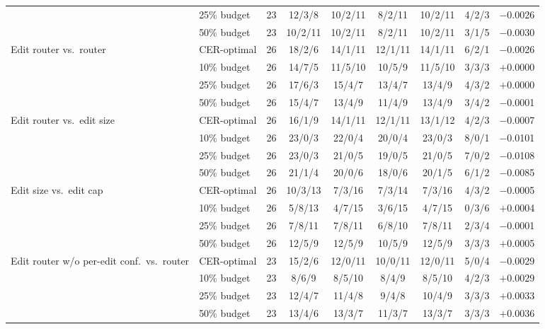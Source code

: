 \begin{tabular}{llrcccccr}
 & 25\% budget & 23 & 12/3/8 & 10/2/11 & 8/2/11 & 10/2/11 & 4/2/3 & $-$0.0026 \\
 & 50\% budget & 23 & 10/2/11 & 10/2/11 & 8/2/11 & 10/2/11 & 3/1/5 & $-$0.0030 \\
\addlinespace[2pt]
Edit router vs.\ router & CER-optimal & 26 & 18/2/6 & 14/1/11 & 12/1/11 & 14/1/11 & 6/2/1 & $-$0.0026 \\
 & 10\% budget & 26 & 14/7/5 & 11/5/10 & 10/5/9 & 11/5/10 & 3/3/3 & $+$0.0000 \\
 & 25\% budget & 26 & 17/6/3 & 15/4/7 & 13/4/7 & 13/4/9 & 4/3/2 & $+$0.0000 \\
 & 50\% budget & 26 & 15/4/7 & 13/4/9 & 11/4/9 & 13/4/9 & 3/4/2 & $-$0.0001 \\
\addlinespace[2pt]
Edit router vs.\ edit size & CER-optimal & 26 & 16/1/9 & 14/1/11 & 12/1/11 & 13/1/12 & 4/2/3 & $-$0.0007 \\
 & 10\% budget & 26 & 23/0/3 & 22/0/4 & 20/0/4 & 23/0/3 & 8/0/1 & $-$0.0101 \\
 & 25\% budget & 26 & 23/0/3 & 21/0/5 & 19/0/5 & 21/0/5 & 7/0/2 & $-$0.0108 \\
 & 50\% budget & 26 & 21/1/4 & 20/0/6 & 18/0/6 & 20/1/5 & 6/1/2 & $-$0.0085 \\
\addlinespace[2pt]
Edit size vs.\ edit cap & CER-optimal & 26 & 10/3/13 & 7/3/16 & 7/3/14 & 7/3/16 & 4/3/2 & $-$0.0005 \\
 & 10\% budget & 26 & 5/8/13 & 4/7/15 & 3/6/15 & 4/7/15 & 0/3/6 & $+$0.0004 \\
 & 25\% budget & 26 & 7/8/11 & 7/8/11 & 6/8/10 & 7/8/11 & 2/3/4 & $-$0.0001 \\
 & 50\% budget & 26 & 12/5/9 & 12/5/9 & 10/5/9 & 12/5/9 & 3/3/3 & $+$0.0005 \\
\addlinespace[2pt]
Edit router w/o per-edit conf.\ vs.\ router & CER-optimal & 23 & 15/2/6 & 12/0/11 & 10/0/11 & 12/0/11 & 5/0/4 & $-$0.0029 \\
 & 10\% budget & 23 & 8/6/9 & 8/5/10 & 8/4/9 & 8/5/10 & 4/2/3 & $+$0.0029 \\
 & 25\% budget & 23 & 12/4/7 & 11/4/8 & 9/4/8 & 10/4/9 & 3/3/3 & $+$0.0033 \\
 & 50\% budget & 23 & 13/4/6 & 13/3/7 & 11/3/7 & 13/3/7 & 3/3/3 & $+$0.0036 \\
\bottomrule
\end{tabular}
